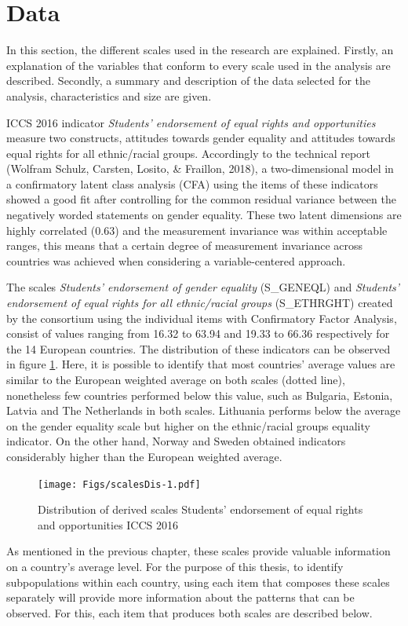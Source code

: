 \documentclass[12pt,a4paper,oneside]{reedthesis}
\begin{document}
\hypertarget{data}{%
\section{Data}\label{data}}

In this section, the different scales used in the research are explained. Firstly, an explanation of the variables that conform to every scale used in the analysis are described. Secondly, a summary and description of the data selected for the analysis, characteristics and size are given.

ICCS 2016 indicator \emph{Students' endorsement of equal rights and opportunities} measure two constructs, attitudes towards gender equality and attitudes towards equal rights for all ethnic/racial groups. Accordingly to the technical report (Wolfram Schulz, Carsten, Losito, \& Fraillon, 2018), a two-dimensional model in a confirmatory latent class analysis (CFA) using the items of these indicators showed a good fit after controlling for the common residual variance between the negatively worded statements on gender equality. These two latent dimensions are highly correlated (0.63) and the measurement invariance was within acceptable ranges, this means that a certain degree of measurement invariance across countries was achieved when considering a variable-centered approach.

The scales \emph{Students' endorsement of gender equality} (S\_GENEQL) and \emph{Students' endorsement of equal rights for all ethnic/racial groups} (S\_ETHRGHT) created by the consortium using the individual items with Confirmatory Factor Analysis, consist of values ranging from 16.32 to 63.94 and 19.33 to 66.36 respectively for the 14 European countries. The distribution of these indicators can be observed in figure \ref{fig:scalesDis}. Here, it is possible to identify that most countries' average values are similar to the European weighted average on both scales (dotted line), nonetheless few countries performed below this value, such as Bulgaria, Estonia, Latvia and The Netherlands in both scales. Lithuania performs below the average on the gender equality scale but higher on the ethnic/racial groups equality indicator. On the other hand, Norway and Sweden obtained indicators considerably higher than the European weighted average.
\begin{figure}
\centering
\texttt{[image: Figs/scalesDis-1.pdf]}
\caption{\label{fig:scalesDis}Distribution of derived scales Students' endorsement of equal rights and opportunities ICCS 2016}
\end{figure}
As mentioned in the previous chapter, these scales provide valuable information on a country's average level. For the purpose of this thesis, to identify subpopulations within each country, using each item that composes these scales separately will provide more information about the patterns that can be observed. For this, each item that produces both scales are described below.
\end{document}

